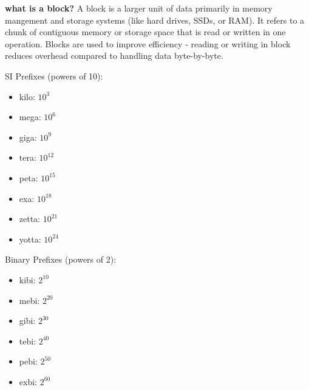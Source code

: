 \documentclass{article}
\begin{document}
\textbf{what is a block?}
A block is a larger unit of data primarily in memory mangement and storage systems (like hard drives, SSDs, or RAM). It refers to a chunk of contiguous memory or storage space that is read or written in one operation. Blocks are used to improve efficiency - reading or writing in block reduces overhead compared to handling data byte-by-byte.

SI Prefixes (powers of 10):
	\begin{itemize}
		\item kilo: $10^3$
		\item mega: $10^6$
		\item giga: $10^9$
		\item tera: $10^{12}$
		\item peta: $10^{15}$
		\item exa: $10^{18}$
		\item zetta: $10^{21}$
		\item yotta: $10^{24}$
	\end{itemize}

Binary Prefixes (powers of 2):
	\begin{itemize}
		\item kibi: $2^{10}$
		\item mebi: $2^{20}$ 
		\item gibi: $2^{30}$ 
		\item tebi: $2^{40}$ 
		\item pebi: $2^{50}$ 
		\item exbi: $2^{60}$ 
	\end{itemize}
\end{document}
